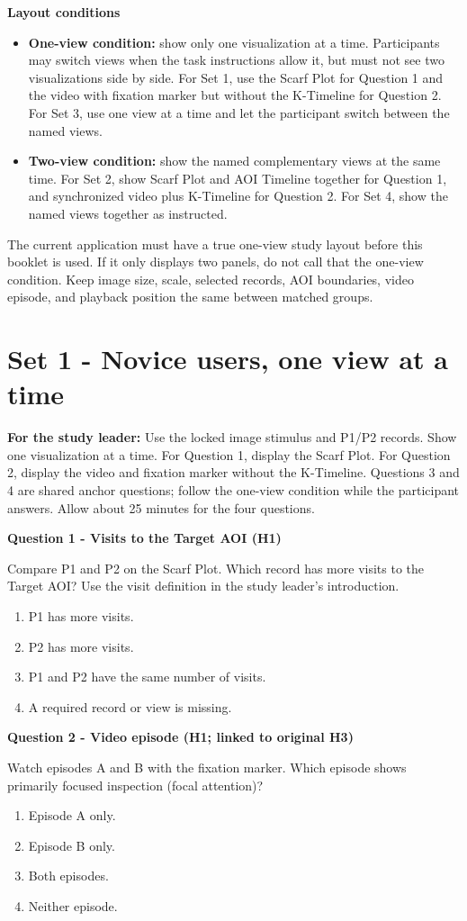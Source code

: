 \documentclass[11pt]{article}
\newcommand{\choices}[5]{\begin{enumerate}[label=\Alph*.,leftmargin=2em,itemsep=0.15em,topsep=0.2em]\item #2\item #3\item #4\item #5\end{enumerate}}
\newcommand{\tasktitle}[1]{\vspace{0.4em}\noindent\textbf{#1}\par}
\begin{document}
\textbf{Layout conditions}
\begin{itemize}
  \item \textbf{One-view condition:} show only one visualization at a time.
  Participants may switch views when the task instructions allow it, but must
  not see two visualizations side by side. For Set 1, use the Scarf Plot for
  Question 1 and the video with fixation marker but without the K-Timeline for
  Question 2. For Set 3, use one view at a time and let the participant switch
  between the named views.
  \item \textbf{Two-view condition:} show the named complementary views at the
  same time. For Set 2, show Scarf Plot and AOI Timeline together for Question
  1, and synchronized video plus K-Timeline for Question 2. For Set 4, show the
  named views together as instructed.
\end{itemize}

The current application must have a true one-view study layout before this
booklet is used. If it only displays two panels, do not call that the one-view
condition. Keep image size, scale, selected records, AOI boundaries, video
episode, and playback position the same between matched groups.

\section*{Set 1 - Novice users, one view at a time}
\textbf{For the study leader:} Use the locked image stimulus and P1/P2 records.
Show one visualization at a time. For Question 1, display the Scarf Plot. For
Question 2, display the video and fixation marker without the K-Timeline.
Questions 3 and 4 are shared anchor questions; follow the one-view condition
while the participant answers. Allow about 25 minutes for the four questions.

\tasktitle{Question 1 - Visits to the Target AOI (H1)}
Compare P1 and P2 on the Scarf Plot. Which record has more visits to the Target
AOI? Use the visit definition in the study leader's introduction.
\choices{}{P1 has more visits.}{P2 has more visits.}{P1 and P2 have the same number of visits.}{A required record or view is missing.}

\tasktitle{Question 2 - Video episode (H1; linked to original H3)}
Watch episodes A and B with the fixation marker. Which episode shows primarily
focused inspection (focal attention)?
\choices{}{Episode A only.}{Episode B only.}{Both episodes.}{Neither episode.}
\end{document}
